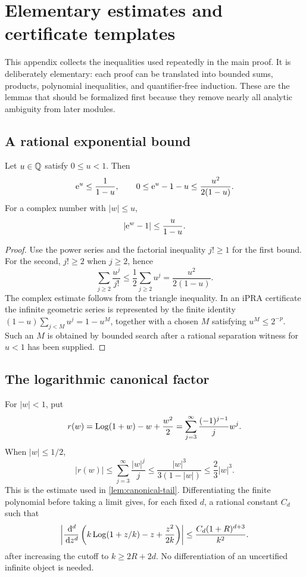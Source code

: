 \appendix
\section{Elementary estimates and certificate templates}\label{sec:appendix-estimates}

This appendix collects the inequalities used repeatedly in the main proof.  It
is deliberately elementary: each proof can be translated into bounded sums,
products, polynomial inequalities, and quantifier-free induction.  These are
the lemmas that should be formalized first because they remove nearly all
analytic ambiguity from later modules.

\subsection{A rational exponential bound}

\begin{lemma}\label{lem:exp-majorant}
Let \(u\in\mathbb Q\) satisfy \(0\le u<1\).  Then
\[
  \mathrm e^u\le \frac1{1-u},
  \qquad
  0\le \mathrm e^u-1-u\le \frac{u^2}{2(1-u)}.
\]
For a complex number with \(\lvert w\rvert\le u\),
\[
  \lvert \mathrm e^w-1\rvert\le \frac{u}{1-u}.
\]
\end{lemma}

\begin{proof}
Use the power series and the factorial inequality \(j!\ge1\) for the first
bound.  For the second, \(j!\ge2\) when \(j\ge2\), hence
\[
 \sum_{j\ge2}\frac{u^j}{j!}
 \le \frac12\sum_{j\ge2}u^j
 =\frac{u^2}{2(1-u)}.
\]
The complex estimate follows from the triangle inequality.  In an iPRA
certificate the infinite geometric series is represented by the finite identity
\((1-u)\sum_{j<M}u^j=1-u^M\), together with a chosen \(M\) satisfying
\(u^M\le2^{-p}\).  Such an \(M\) is obtained by bounded search after a rational
separation witness for \(u<1\) has been supplied.
\end{proof}

\subsection{The logarithmic canonical factor}

For \(\lvert w\rvert<1\), put
\[
  r(w)=\operatorname{Log}(1+w)-w+\frac{w^2}{2}
      =\sum_{j=3}^{\infty}\frac{(-1)^{j-1}}{j}w^j.
\]
When \(\lvert w\rvert\le1/2\),
\begin{equation}\label{eq:r-bound-appendix}
  \lvert r(w)\rvert
  \le \sum_{j=3}^{\infty}\frac{\lvert w\rvert^j}{j}
  \le \frac{\lvert w\rvert^3}{3(1-\lvert w\rvert)}
  \le \frac{2}{3}\lvert w\rvert^3.
\end{equation}
This is the estimate used in \cref{lem:canonical-tail}.  Differentiating the
finite polynomial before taking a limit gives, for each fixed \(d\), a rational
constant \(C_d\) such that
\[
  \left|\frac{\,\mathrm d^d}{\,\mathrm d z^d}
   \left(k\operatorname{Log}(1+z/k)-z+\frac{z^2}{2k}\right)\right|
   \le \frac{C_d(1+R)^{d+3}}{k^2}.
\]
after increasing the cutoff to \(k\ge2R+2d\).  No differentiation of an
uncertified infinite object is needed.

